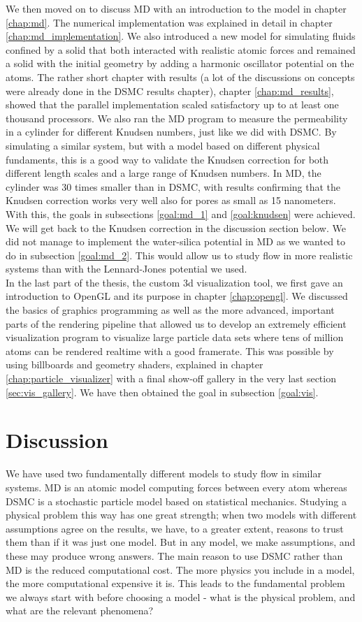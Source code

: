 We then moved on to discuss MD with an introduction to the model in chapter \ref{chap:md}. The numerical implementation was explained in detail in chapter \ref{chap:md_implementation}. We also introduced a new model for simulating fluids confined by a solid that both interacted with realistic atomic forces and remained a solid with the initial geometry by adding a harmonic oscillator potential on the atoms. The rather short chapter with results (a lot of the discussions on concepts were already done in the DSMC results chapter), chapter \ref{chap:md_results}, showed that the parallel implementation scaled satisfactory up to at least one thousand processors. We also ran the MD program to measure the permeability in a cylinder for different Knudsen numbers, just like we did with DSMC. By simulating a similar system, but with a model based on different physical fundaments, this is a good way to validate the Knudsen correction for both different length scales and a large range of Knudsen numbers. In MD, the cylinder was 30 times smaller than in DSMC, with results confirming that the Knudsen correction works very well also for pores as small as 15 nanometers. With this, the goals in subsections \ref{goal:md_1} and \ref{goal:knudsen} were achieved. We will get back to the Knudsen correction in the discussion section below. We did not manage to implement the water-silica potential in MD as we wanted to do in subsection \ref{goal:md_2}. This would allow us to study flow in more realistic systems than with the Lennard-Jones potential we used.
\\
In the last part of the thesis, the custom 3d visualization tool, we first gave an introduction to OpenGL and its purpose in chapter \ref{chap:opengl}. We discussed the basics of graphics programming as well as the more advanced, important parts of the rendering pipeline that allowed us to develop an extremely efficient visualization program to visualize large particle data sets where tens of million atoms can be rendered realtime with a good framerate. This was possible by using billboards and geometry shaders, explained in chapter \ref{chap:particle_visualizer} with a final show-off gallery in the very last section \ref{sec:vis_gallery}. We have then obtained the goal in subsection \ref{goal:vis}.
\section{Discussion}
We have used two fundamentally different models to study flow in similar systems. MD is an atomic model computing forces between every atom whereas DSMC is a stochastic particle model based on statistical mechanics. Studying a physical problem this way has one great strength; when two models with different assumptions agree on the results, we have, to a greater extent, reasons to trust them than if it was just one model. But in any model, we make assumptions, and these may produce wrong answers. The main reason to use DSMC rather than MD is the reduced computational cost. The more physics you include in a model, the more computational expensive it is. This leads to the fundamental problem we always start with before choosing a model - what is the physical problem, and what are the relevant phenomena?\\
